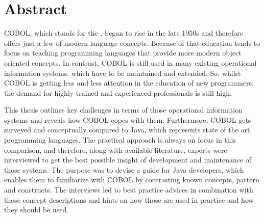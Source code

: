 \chapter*{Abstract} 

COBOL, which stands for the , began to rise in the late 1950s and therefore offers just a few of modern language concepts. Because of that education tends to focus on teaching programming languages that provide more modern object oriented concepts. In contrast, COBOL is still used in many existing operational information systems, which have to be maintained and extended. So, whilst COBOL is getting less and less attention in the education of new programmers, the demand for highly trained and experienced professionals is still high. 

This thesis outlines key challenges in terms of those operational information systems and reveals how COBOL copes with them. Furthermore, COBOL gets surveyed and conceptually compared to Java, which represents state of the art programming languages. The practical approach is always on focus in this comparison, and therefore, along with available literature, experts were interviewed to get the best possible insight of development and maintenance of those systems. The purpose was to devise a guide for Java developers, which enables them to familiarize with COBOL by contrasting known concepts, pattern and constructs. The interviews led to best practice advices in combination with those concept descriptions and hints on how those are used in practice and how they should be used.